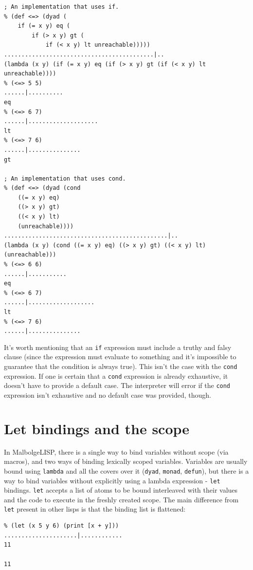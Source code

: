 \begin{verbatim}
; An implementation that uses if.
% (def <=> (dyad (
    if (= x y) eq (
        if (> x y) gt (
            if (< x y) lt unreachable)))))
...........................................|..
(lambda (x y) (if (= x y) eq (if (> x y) gt (if (< x y) lt unreachable))))
% (<=> 5 5)
......|..........
eq
% (<=> 6 7)
......|....................
lt
% (<=> 7 6)
......|...............
gt

; An implementation that uses cond.
% (def <=> (dyad (cond
    ((= x y) eq)
    ((> x y) gt)
    ((< x y) lt)
    (unreachable))))
...............................................|..
(lambda (x y) (cond ((= x y) eq) ((> x y) gt) ((< x y) lt) (unreachable)))
% (<=> 6 6)
......|...........
eq
% (<=> 6 7)
......|...................
lt
% (<=> 7 6)
......|...............
\end{verbatim}

\par It's worth mentioning that an \verb|if| expression must include a truthy and falsy clause (since the expression must evaluate to something and it's impossible to guarantee that the condition is always true). This isn't the case with the \verb|cond| expression. If one is certain that a \verb|cond| expression is already exhaustive, it doesn't have to provide a default case. The interpreter will error if the \verb|cond| expression isn't exhaustive and no default case was provided, though.

\section{Let bindings and the scope}

\par In MalbolgeLISP, there is a single way to bind variables without scope (via macros), and two ways of binding lexically scoped variables. Variables are usually bound using \verb|lambda| and all the covers over it (\verb|dyad|, \verb|monad|, \verb|defun|), but there is a way to bind variables without explicitly using a lambda expression - \verb|let| bindings. \verb|let| accepts a list of atoms to be bound interleaved with their values and the code to execute in the freshly created scope. The main difference from \verb|let| present in other lisps is that the binding list is flattened:

\begin{verbatim}
% (let (x 5 y 6) (print [x + y]))
.....................|............
11

11
\end{verbatim}

